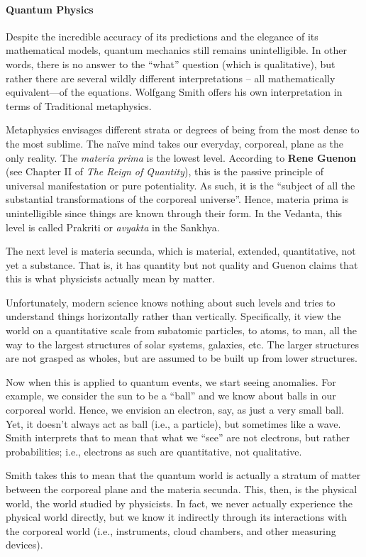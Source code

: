 \paragraph{Quantum Physics}


Despite the incredible accuracy of its predictions and the elegance of its mathematical models, quantum mechanics still remains unintelligible. In other words, there is no answer to the ``what'' question (which is qualitative), but rather there are several wildly different interpretations -- all mathematically equivalent---of the equations. Wolfgang Smith offers his own interpretation in terms of Traditional metaphysics.

Metaphysics envisages different strata or degrees of being from the most dense to the most sublime. The naïve mind takes our everyday, corporeal, plane as the only reality. The \emph{materia prima} is the lowest level. According to \textbf{Rene Guenon} (see Chapter II of \emph{The Reign of Quantity}), this is the passive principle of universal manifestation or pure potentiality. As such, it is the ``subject of all the substantial transformations of the corporeal universe''. Hence, materia prima is unintelligible since things are known through their form. In the Vedanta, this level is called Prakriti or \emph{avyakta} in the Sankhya.

The next level is materia secunda, which is material, extended, quantitative, not yet a substance. That is, it has quantity but not quality and Guenon claims that this is what physicists actually mean by matter.

Unfortunately, modern science knows nothing about such levels and tries to understand things horizontally rather than vertically. Specifically, it view the world on a quantitative scale from subatomic particles, to atoms, to man, all the way to the largest structures of solar systems, galaxies, etc. The larger structures are not grasped as wholes, but are assumed to be built up from lower structures.

Now when this is applied to quantum events, we start seeing anomalies. For example, we consider the sun to be a ``ball'' and we know about balls in our corporeal world. Hence, we envision an electron, say, as just a very small ball. Yet, it doesn't always act as ball (i.e., a particle), but sometimes like a wave. Smith interprets that to mean that what we ``see'' are not electrons, but rather probabilities; i.e., electrons as such are quantitative, not qualitative.

Smith takes this to mean that the quantum world is actually a stratum of matter between the corporeal plane and the materia secunda. This, then, is the physical world, the world studied by physicists. In fact, we never actually experience the physical world directly, but we know it indirectly through its interactions with the corporeal world (i.e., instruments, cloud chambers, and other measuring devices).

